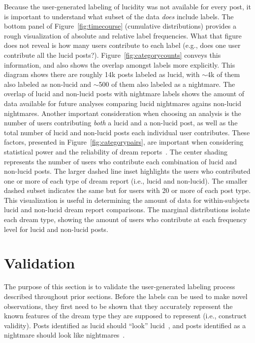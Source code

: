 \documentclass[10pt,a4paper,twocolumn]{article}
\begin{document}
Because the user-generated labeling of lucidity was not available for every post, it is important to understand what subset of the data \emph{does} include labels. The bottom panel of Figure~\ref{fig:timecourse} (cumulative distributions) provides a rough visualization of absolute and relative label frequencies. What that figure does not reveal is how many users contribute to each label (e.g., does one user contribute all the lucid posts?). Figure~\ref{fig:categorycounts} conveys this information, and also shows the overlap amongst labels more explicitly. This diagram shows there are roughly 14k posts labeled as lucid, with $\sim$4k of them also labeled as non-lucid and $\sim$500 of them also labeled as a nightmare. The overlap of lucid and non-lucid posts with nightmare labels shows the amount of data available for future analyses comparing lucid nightmares agains non-lucid nightmares. Another important consideration when choosing an analysis is the number of users contributing \emph{both} a lucid and a non-lucid post, as well as the total number of lucid and non-lucid posts each individual user contributes. These factors, presented in Figure~\ref{fig:categorypairs}, are important when considering statistical power and the reliability of dream reports~\cite{schredl1998}. The center shading represents the number of users who contribute each combination of lucid and non-lucid posts. The larger dashed line inset highlights the users who contributed one or more of each type of dream report (i.e., lucid and non-lucid). The smaller dashed subset indicates the same but for users with 20 or more of each post type. This visualization is useful in determining the amount of data for within-subjects lucid and non-lucid dream report comparisons. The marginal distributions isolate each dream type, showing the amount of users who contribute at each frequency level for lucid and non-lucid posts.

\section{Validation}\label{sec:validation}

The purpose of this section is to validate the user-generated labeling process described throughout prior sections. Before the labels can be used to make novel observations, they first need to be shown that they accurately represent the known features of the dream type they are supposed to represent (i.e., construct validity). Posts identified as lucid should ``look'' lucid~\cite{stumbrys2014,motarolim2013,bulkeley2018,voss2013,mallett2021}, and posts identified as a nightmare should look like nightmares~\cite{standards2010,bulkeley2018}.
\end{document}
